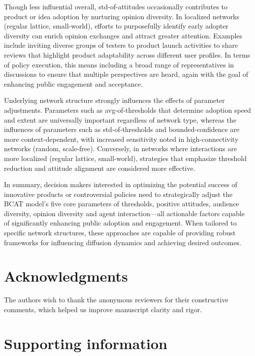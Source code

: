 \documentclass[10pt,letterpaper]{article}
\begin{document}
Though less influential overall, std-of-attitudes occasionally contributes to product or idea adoption by nurturing opinion diversity. In localized networks (regular lattice, small-world), efforts to purposefully identify early adopter diversity can enrich opinion exchanges and attract greater attention. Examples include inviting diverse groups of testers to product launch activities to share reviews that highlight product adaptability across different user profiles. In terms of policy execution, this means including a broad range of representatives in discussions to ensure that multiple perspectives are heard, again with the goal of enhancing public engagement and acceptance.

Underlying network structure strongly influences the effects of parameter adjustments. Parameters such as avg-of-thresholds that determine adoption speed and extent are universally important regardless of network type, whereas the influences of parameters such as std-of-thresholds and bounded-confidence are more context-dependent, with increased sensitivity noted in high-connectivity networks (random, scale-free). Conversely, in networks where interactions are more localized (regular lattice, small-world), strategies that emphasize threshold reduction and attitude alignment are considered more effective.

In summary, decision makers interested in optimizing the potential success of innovative products or controversial policies need to strategically adjust the BCAT model's five core parameters of thresholds, positive attitudes, audience diversity, opinion diversity and agent interaction---all actionable factors capable of significantly enhancing public adoption and engagement. When tailored to specific network structures, these approaches are capable of providing robust frameworks for influencing diffusion dynamics and achieving desired outcomes.

\section*{Acknowledgments}

The authors wish to thank the anonymous reviewers for their constructive comments, which helped us improve manuscript clarity and rigor.

\nolinenumbers



\section*{Supporting information}
\end{document}
